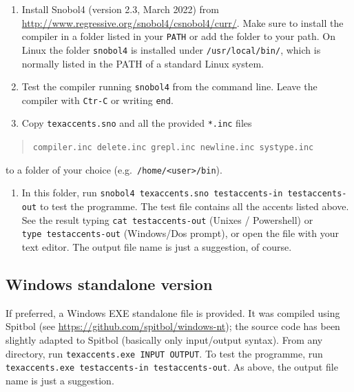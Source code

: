 \documentclass[
  12pt,
  english,
]{article}
\providecommand{\tightlist}{%
  \setlength{\itemsep}{0pt}\setlength{\parskip}{0pt}}
\begin{document}
\begin{enumerate}
\def\labelenumi{\arabic{enumi}.}
\item
  Install Snobol4 (version 2.3, March 2022) from
  \url{http://www.regressive.org/snobol4/csnobol4/curr/}. Make sure to
  install the compiler in a folder listed in your \texttt{PATH} or add
  the folder to your path. On Linux the folder \texttt{snobol4} is
  installed under \texttt{/usr/local/bin/}, which is normally listed in
  the PATH of a standard Linux system.
\item
  Test the compiler running \texttt{snobol4} from the command line.
  Leave the compiler with \texttt{Ctr-C} or writing \texttt{end}.
\item
  Copy \texttt{texaccents.sno} and all the provided \texttt{*.inc} files
\end{enumerate}

\begin{quote}
\texttt{compiler.inc}~\texttt{delete.inc}~\texttt{grepl.inc}~\texttt{newline.inc}~\texttt{systype.inc}
\end{quote}

to a folder of your choice
(e.g.~\texttt{/home/\textless{}user\textgreater{}/bin}).

\begin{enumerate}
\def\labelenumi{\arabic{enumi}.}
\setcounter{enumi}{3}
\tightlist
\item
  In this folder, run
  \texttt{snobol4\ texaccents.sno\ testaccents-in\ testaccents-out} to
  test the programme. The test file contains all the accents listed
  above. See the result typing \texttt{cat~testaccents-out} (Unixes /
  Powershell) or \texttt{type~testaccents-out} (Windows/Dos prompt), or
  open the file with your text editor. The output file name is just a
  suggestion, of course.
\end{enumerate}

\hypertarget{windows-standalone-version}{%
\subsection{Windows standalone
version}\label{windows-standalone-version}}

If preferred, a Windows EXE standalone file is provided. It was compiled
using Spitbol (see \url{https://github.com/spitbol/windows-nt}); the
source code has been slightly adapted to Spitbol (basically only
input/output syntax). From any directory, run
\texttt{texaccents.exe\ INPUT\ OUTPUT}. To test the programme, run
\texttt{texaccents.exe\ testaccents-in\ testaccents-out}. As above, the
output file name is just a suggestion.
\end{document}
